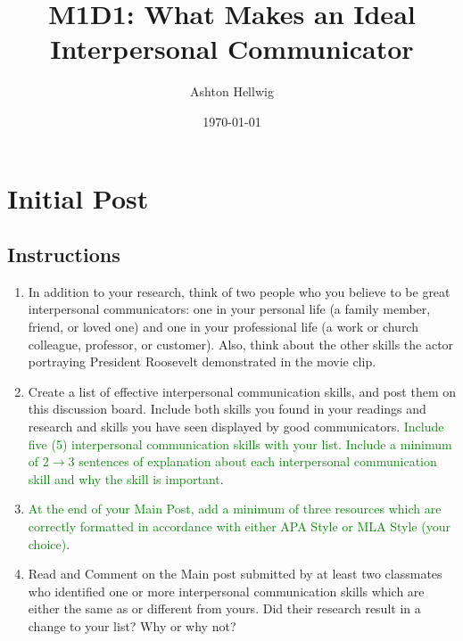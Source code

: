 \documentclass[stu,12pt]{apa7}
\title{%
    M1D1: What Makes an Ideal Interpersonal Communicator
  }
\author{Ashton Hellwig}
\date{\today}
\begin{document}
  \maketitle

  \section{Initial Post}
    \subsection*{Instructions}
      \begin{enumerate}
        \item In addition to your research, think of two people who you believe
          to be great interpersonal communicators: one in your personal life (a
          family member, friend, or loved one) and one in your professional life
          (a work or church colleague, professor, or customer). Also, think
          about the other skills the actor portraying President Roosevelt
          demonstrated in the movie clip.
        \item Create a list of effective interpersonal communication skills, and
          post them on this discussion board. Include both skills you found in
          your readings and research and skills you have seen displayed by good
          communicators. \textcolor{green}{Include five (5) interpersonal
          communication skills with your list. Include a minimum of
          \(2\rightarrow 3\) sentences of explanation about each interpersonal
          communication skill and why the skill is important}.
        \item \textcolor{green}{At the end of your Main Post, add a minimum
          of three resources which are correctly formatted in accordance with
          either APA Style or MLA Style (your choice)}.
        \item Read and Comment on the Main post submitted by at least two
          classmates who identified one or more interpersonal communication
          skills which are either the same as or different from yours. Did their
          research result in a change to your list? Why or why not?
      \end{enumerate}

    \newpage
\end{document}
